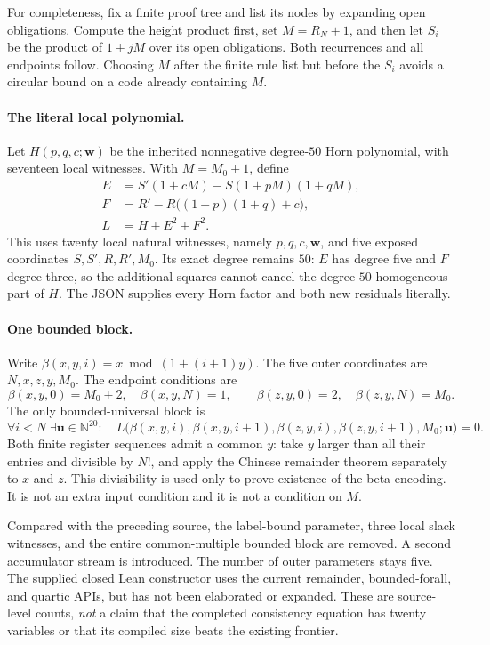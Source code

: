 For completeness, fix a finite proof tree and list its nodes by expanding
open obligations. Compute the height product first, set $M=R_N+1$, and
then let $S_i$ be the product of $1+jM$ over its open obligations. Both
recurrences and all endpoints follow. Choosing $M$ after the finite rule
list but before the $S_i$ avoids a circular bound on a code already
containing $M$.

\paragraph{The literal local polynomial.}
Let $H(p,q,c;\mathbf w)$ be the inherited nonnegative degree-$50$ Horn
polynomial, with seventeen local witnesses. With $M=M_0+1$, define
\begin{align*}
 E&=S'(1+cM)-S(1+pM)(1+qM),\\
 F&=R'-R\bigl((1+p)(1+q)+c\bigr),\\
 L&=H+E^2+F^2.
\end{align*}
This uses twenty local natural witnesses, namely $p,q,c,\mathbf w$, and
five exposed coordinates $S,S',R,R',M_0$. Its exact degree remains $50$:
$E$ has degree five and $F$ degree three, so the additional squares cannot
cancel the degree-$50$ homogeneous part of $H$. The JSON supplies every
Horn factor and both new residuals literally.

\paragraph{One bounded block.}
Write $\beta(x,y,i)=x\bmod(1+(i+1)y)$. The five outer coordinates are
$N,x,z,y,M_0$. The endpoint conditions are
\[
 \beta(x,y,0)=M_0+2,\quad \beta(x,y,N)=1,\qquad
 \beta(z,y,0)=2,\quad \beta(z,y,N)=M_0.
\]
The only bounded-universal block is
\[
 \forall i<N\;\exists\mathbf u\in\mathbb N^{20}:\quad
 L\bigl(\beta(x,y,i),\beta(x,y,i+1),
         \beta(z,y,i),\beta(z,y,i+1),M_0;\mathbf u\bigr)=0.
\]
Both finite register sequences admit a common $y$: take $y$ larger than
all their entries and divisible by $N!$, and apply the Chinese remainder
theorem separately to $x$ and $z$. This divisibility is used only to prove
existence of the beta encoding. It is not an extra input condition and
it is not a condition on $M$.

Compared with the preceding source, the label-bound parameter, three
local slack witnesses, and the entire common-multiple bounded block are
removed. A second accumulator stream is introduced. The number of outer
parameters stays five. The supplied closed Lean constructor uses the
current remainder, bounded-forall, and quartic APIs, but has not been
elaborated or expanded. These are source-level counts, \emph{not} a
claim that the completed consistency equation has twenty variables or
that its compiled size beats the existing frontier.


